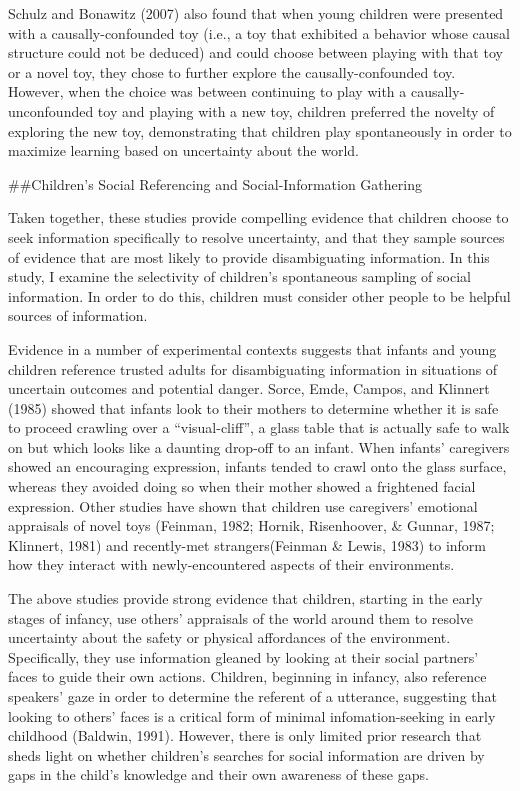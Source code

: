 \documentclass[,man,floatsintext]{apa6}
\begin{document}
Schulz and Bonawitz (2007) also found that when young children were presented with a causally-confounded toy (i.e., a toy that exhibited a behavior whose causal structure could not be deduced) and could choose between playing with that toy or a novel toy, they chose to further explore the causally-confounded toy. However, when the choice was between continuing to play with a causally-unconfounded toy and playing with a new toy, children preferred the novelty of exploring the new toy, demonstrating that children play spontaneously in order to maximize learning based on uncertainty about the world.

\#\#Children's Social Referencing and Social-Information Gathering

Taken together, these studies provide compelling evidence that children choose to seek information specifically to resolve uncertainty, and that they sample sources of evidence that are most likely to provide disambiguating information. In this study, I examine the selectivity of children's spontaneous sampling of social information. In order to do this, children must consider other people to be helpful sources of information.

Evidence in a number of experimental contexts suggests that infants and young children reference trusted adults for disambiguating information in situations of uncertain outcomes and potential danger. Sorce, Emde, Campos, and Klinnert (1985) showed that infants look to their mothers to determine whether it is safe to proceed crawling over a \enquote{visual-cliff}, a glass table that is actually safe to walk on but which looks like a daunting drop-off to an infant. When infants' caregivers showed an encouraging expression, infants tended to crawl onto the glass surface, whereas they avoided doing so when their mother showed a frightened facial expression. Other studies have shown that children use caregivers' emotional appraisals of novel toys (Feinman, 1982; Hornik, Risenhoover, \& Gunnar, 1987; Klinnert, 1981) and recently-met strangers(Feinman \& Lewis, 1983) to inform how they interact with newly-encountered aspects of their environments.

The above studies provide strong evidence that children, starting in the early stages of infancy, use others' appraisals of the world around them to resolve uncertainty about the safety or physical affordances of the environment. Specifically, they use information gleaned by looking at their social partners' faces to guide their own actions. Children, beginning in infancy, also reference speakers' gaze in order to determine the referent of a utterance, suggesting that looking to others' faces is a critical form of minimal infomation-seeking in early childhood (Baldwin, 1991). However, there is only limited prior research that sheds light on whether children's searches for social information are driven by gaps in the child's knowledge and their own awareness of these gaps.
\end{document}
